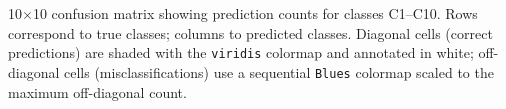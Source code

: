 \caption{10$\times$10 confusion matrix showing prediction counts for classes C1--C10. Rows correspond to true classes; columns to predicted classes. Diagonal cells (correct predictions) are shaded with the \texttt{viridis} colormap and annotated in white; off-diagonal cells (misclassifications) use a sequential \texttt{Blues} colormap scaled to the maximum off-diagonal count.}
